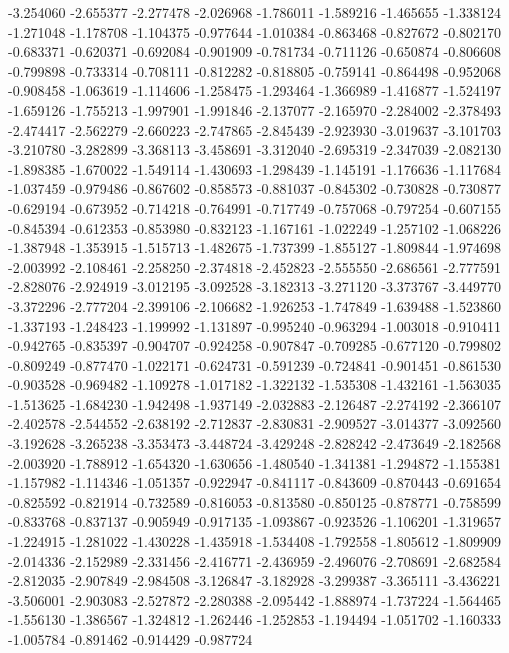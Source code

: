 -3.254060
-2.655377
-2.277478
-2.026968
-1.786011
-1.589216
-1.465655
-1.338124
-1.271048
-1.178708
-1.104375
-0.977644
-1.010384
-0.863468
-0.827672
-0.802170
-0.683371
-0.620371
-0.692084
-0.901909
-0.781734
-0.711126
-0.650874
-0.806608
-0.799898
-0.733314
-0.708111
-0.812282
-0.818805
-0.759141
-0.864498
-0.952068
-0.908458
-1.063619
-1.114606
-1.258475
-1.293464
-1.366989
-1.416877
-1.524197
-1.659126
-1.755213
-1.997901
-1.991846
-2.137077
-2.165970
-2.284002
-2.378493
-2.474417
-2.562279
-2.660223
-2.747865
-2.845439
-2.923930
-3.019637
-3.101703
-3.210780
-3.282899
-3.368113
-3.458691
-3.312040
-2.695319
-2.347039
-2.082130
-1.898385
-1.670022
-1.549114
-1.430693
-1.298439
-1.145191
-1.176636
-1.117684
-1.037459
-0.979486
-0.867602
-0.858573
-0.881037
-0.845302
-0.730828
-0.730877
-0.629194
-0.673952
-0.714218
-0.764991
-0.717749
-0.757068
-0.797254
-0.607155
-0.845394
-0.612353
-0.853980
-0.832123
-1.167161
-1.022249
-1.257102
-1.068226
-1.387948
-1.353915
-1.515713
-1.482675
-1.737399
-1.855127
-1.809844
-1.974698
-2.003992
-2.108461
-2.258250
-2.374818
-2.452823
-2.555550
-2.686561
-2.777591
-2.828076
-2.924919
-3.012195
-3.092528
-3.182313
-3.271120
-3.373767
-3.449770
-3.372296
-2.777204
-2.399106
-2.106682
-1.926253
-1.747849
-1.639488
-1.523860
-1.337193
-1.248423
-1.199992
-1.131897
-0.995240
-0.963294
-1.003018
-0.910411
-0.942765
-0.835397
-0.904707
-0.924258
-0.907847
-0.709285
-0.677120
-0.799802
-0.809249
-0.877470
-1.022171
-0.624731
-0.591239
-0.724841
-0.901451
-0.861530
-0.903528
-0.969482
-1.109278
-1.017182
-1.322132
-1.535308
-1.432161
-1.563035
-1.513625
-1.684230
-1.942498
-1.937149
-2.032883
-2.126487
-2.274192
-2.366107
-2.402578
-2.544552
-2.638192
-2.712837
-2.830831
-2.909527
-3.014377
-3.092560
-3.192628
-3.265238
-3.353473
-3.448724
-3.429248
-2.828242
-2.473649
-2.182568
-2.003920
-1.788912
-1.654320
-1.630656
-1.480540
-1.341381
-1.294872
-1.155381
-1.157982
-1.114346
-1.051357
-0.922947
-0.841117
-0.843609
-0.870443
-0.691654
-0.825592
-0.821914
-0.732589
-0.816053
-0.813580
-0.850125
-0.878771
-0.758599
-0.833768
-0.837137
-0.905949
-0.917135
-1.093867
-0.923526
-1.106201
-1.319657
-1.224915
-1.281022
-1.430228
-1.435918
-1.534408
-1.792558
-1.805612
-1.809909
-2.014336
-2.152989
-2.331456
-2.416771
-2.436959
-2.496076
-2.708691
-2.682584
-2.812035
-2.907849
-2.984508
-3.126847
-3.182928
-3.299387
-3.365111
-3.436221
-3.506001
-2.903083
-2.527872
-2.280388
-2.095442
-1.888974
-1.737224
-1.564465
-1.556130
-1.386567
-1.324812
-1.262446
-1.252853
-1.194494
-1.051702
-1.160333
-1.005784
-0.891462
-0.914429
-0.987724
